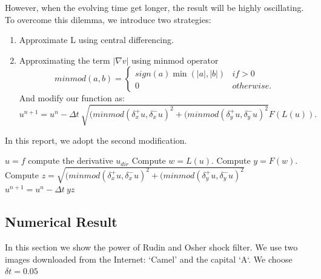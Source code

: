 \documentclass{article}
\begin{document}
However, when the evolving time get longer, the result will be highly oscillating. To overcome this dilemma, we introduce two strategies:
\begin{enumerate}
\item Approximate L using central differencing.
\item Approximating the term $|\nabla v|$ using minmod operator
\begin{equation}
minmod(a,b) = \left\{ \begin{array}{cc} sign(a)\min (|a|, |b|) & if >0 \\0 & otherwise.\end{array}\right.
\end{equation}
And modify our function as:
$$u^{n+1} = u^n - \Delta t~\sqrt{(minmod(\delta_x^+u,\delta_x^-u)^2 + (minmod(\delta_y^+u,\delta_y^-u)^2}F(L(u)).$$
\end{enumerate}
In this report, we adopt the second modification.

\begin{algorithm}
\caption{$u = shock\_filter(f,T,\Delta t, F, L)$} 
\begin{algorithmic}[1]
\STATE $u = f$
\STATE compute the derivative $u_{dir}$
\ENDFOR
\STATE Compute $w = L(u)$.
\STATE Compute $y = F(w)$.
\STATE Compute $z = \sqrt{(minmod(\delta_x^+u,\delta_x^-u)^2 + (minmod(\delta_y^+u,\delta_y^-u)^2}$
\STATE $u^{n+1} = u^n -\Delta t ~ yz$
\ENDFOR
\end{algorithmic}
\end{algorithm}

\subsection{Numerical Result}
In this section we show the power of Rudin and Osher shock filter. We use two images downloaded from the Internet: `Camel' and the capital  `A`. We choose $\delta t = 0.05$
\end{document}
